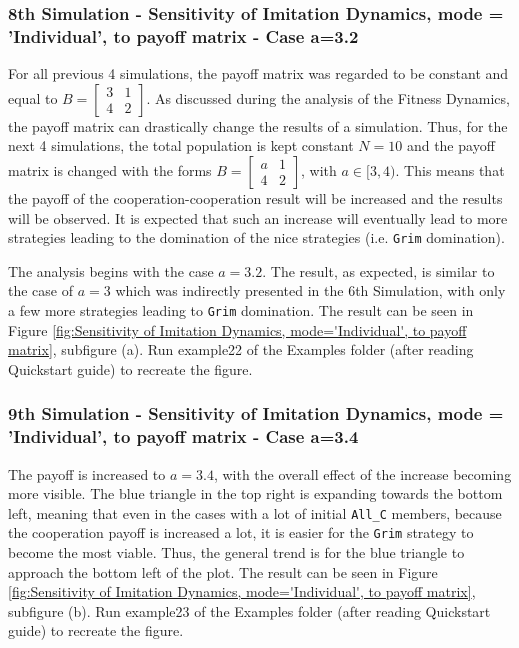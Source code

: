 \subsubsection{8th Simulation - Sensitivity of Imitation Dynamics, mode = 'Individual', to payoff matrix - Case a=3.2}
For all previous 4 simulations, the payoff matrix was regarded to be constant and equal to $B = \begin{bmatrix} 3 & 1 \\ 4 & 2 \end{bmatrix}$. As discussed during the analysis of the Fitness Dynamics, the payoff matrix can drastically change the results of a simulation. Thus, for the next 4 simulations, the total population is kept constant $N=10$ and the payoff matrix is changed with the forms $B = \begin{bmatrix} a & 1 \\ 4 & 2 \end{bmatrix}$, with $a \in [3,4)$. This means that the payoff of the cooperation-cooperation result will be increased and the results will be observed. It is expected that such an increase will eventually lead to more strategies leading to the domination of the nice strategies (i.e. \texttt{Grim} domination). 

The analysis begins with the case $a = 3.2$. The result, as expected, is similar to the case of $a=3$ which was indirectly presented in the 6th Simulation, with only a few more strategies leading to \texttt{Grim} domination. The result can be seen in Figure \ref{fig:Sensitivity of Imitation Dynamics, mode='Individual', to payoff matrix}, subfigure (a). Run example22 of the Examples folder (after reading Quickstart guide) to recreate the figure.

\subsubsection{9th Simulation - Sensitivity of Imitation Dynamics, mode = 'Individual', to payoff matrix - Case a=3.4}
The payoff is increased to $a=3.4$, with the overall effect of the increase becoming more visible. The blue triangle in the top right is expanding towards the bottom left, meaning that even in the cases with a lot of initial \texttt{All\_C} members, because the cooperation payoff is increased a lot, it is easier for the \texttt{Grim} strategy to become the most viable. Thus, the general trend is for the blue triangle to approach the bottom left of the plot. The result can be seen in Figure \ref{fig:Sensitivity of Imitation Dynamics, mode='Individual', to payoff matrix}, subfigure (b). Run example23 of the Examples folder (after reading Quickstart guide) to recreate the figure.

